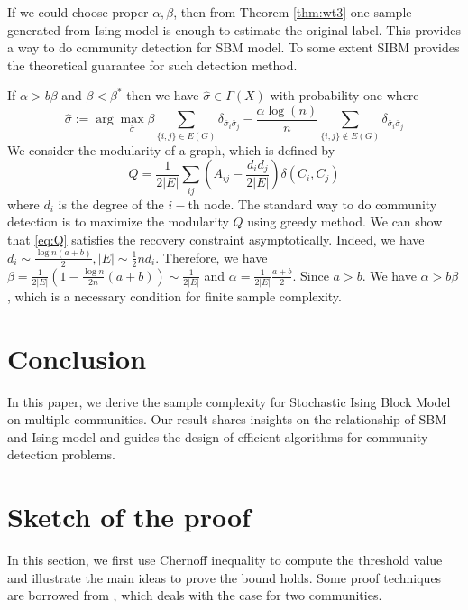 \label{key}\documentclass[conference]{IEEEtran}
\newcommand{\ide}[2]{ \delta_{#1 #2} }
\begin{document}
If we could choose proper $\alpha, \beta$, then from Theorem \ref{thm:wt3} one sample generated from Ising model is enough to
estimate the original label. This provides a way to do community detection for SBM model.
To some extent
SIBM provides the theoretical guarantee for such detection method.

If $\alpha > b \beta$ and $\beta < \beta^*$ then we have $\hat{\sigma} \in \Gamma(X)$ with probability
one where
\begin{equation}\label{eq:hat_sigma}
\hat{\sigma} := \arg\max_{\bar{\sigma}}\beta \sum_{\{i,j\}\in E(G)} \ide{\bar{\sigma}_i}{\bar{\sigma}_j}
-\frac{\alpha\log(n)}{n} \sum_{\{i,j\}\notin E(G)} \ide{\bar{\sigma}_i}{\bar{\sigma}_j} 
\end{equation}
We consider the modularity of a graph, which is defined by
\begin{equation}\label{eq:Q}
	Q = \frac{1}{2 |E|} \sum_{ij} (A_{ij} - \frac{d_i d_j}{2 |E|}) \delta(C_i, C_j)
\end{equation}
where $d_i$ is the degree of the $i-$th node.
The standard way to do community detection is to maximize the modularity $Q$ using greedy method.
We can show that \eqref{eq:Q} satisfies the recovery constraint asymptotically.
Indeed, we have $d_i \sim \frac{\log n(a+b)}{2}, |E| \sim \frac{1}{2}n d_i$. Therefore, we have $\beta = \frac{1}{2|E|}(1-\frac{\log n}{2n}(a+b))
\sim \frac{1}{2|E|}$
and $\alpha = \frac{1}{2|E|}\frac{a+b}{2}$. Since $a>b$. We have $\alpha > b \beta$, which is a necessary condition for finite sample complexity.

\section{Conclusion}\label{s:conclusion}
In this paper, we derive the sample complexity for Stochastic Ising Block Model on multiple communities.
Our result shares insights on the relationship of SBM and Ising model and guides the design of efficient algorithms
for community detection problems.
\appendix
\section{Sketch of the proof}
\label{sect:sketch}

In this section, we first use Chernoff inequality to compute the threshold value and illustrate the main ideas to prove the bound holds.
Some proof techniques are borrowed from \cite{ye2020exact}, which deals with the case for two communities.
\end{document}
